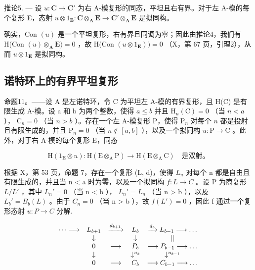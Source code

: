 推论5. --- 设 \(u: \mathbf{C} \to \mathbf{C}'\) 为右 A-模复形的同态，平坦且右有界。对于左 A-模的每个复形 E，态射 \(u \otimes 1_{\mathbf{E}}: \mathbf{C} \otimes_{\mathbf{A}} \mathbf{E} \to \mathbf{C}' \otimes_{\mathbf{A}} \mathbf{E}\) 是拟同构。

确实，Con \((u)\) 是一个平坦复形，右有界且同调为零；因此由推论4，我们有 H(Con \((u) \otimes_{\mathbf{A}} \mathbf{E}) = 0\) ，故 H(Con \((u \otimes 1_{\mathbf{E}})) = 0\) （X，第 67 页，引理2），从而 \(u \otimes 1_{\mathbf{E}}\) 是拟同构。

\subsection{诺特环上的有界平坦复形}

命题11。——设 A 是左诺特环，令 C 为平坦左 A-模的有界复形，且 H(C) 是有限生成 A-模。设 a 和 b 为两个整数，使得 \(a \leqslant b\) 并且 \(\mathrm{H}_{n}(\mathrm{C}) = 0\) （当 \(n < a\) ）， \(\mathrm{C}_{n} = 0\) （当 \(n > b\) ）。存在一个左 A-模复形 P，使得 \(\mathrm{P}_{n}\) 对每个 \(n\) 都是投射且有限生成的，并且 \(\mathrm{P}_{n} = 0\) （当 \(n \notin [a, b]\) ），以及一个拟同构 \(u: \mathrm{P} \to \mathrm{C}\) 。此外，对于右 A-模的每个复形 E，同态

\[
\mathrm{H} \left(1 _ {\mathrm{E}} \otimes u\right): \mathrm{H} (\mathrm{E} \otimes_ {\mathrm{A}} \mathrm{P}) \rightarrow \mathrm{H} (\mathrm{E} \otimes_ {\mathrm{A}} \mathrm{C}) \quad \text{是双射。}
\]

根据 X，第 53 页，命题 7，存在一个复形 (L, d)，使得 \(L_{n}\) 对每个 n 都是自由且有限生成的，并且当 n \textless{} a 时为零，以及一个拟同构 \(f: L \to C\) 。设 P 为商复形 \(L/L'\) ，其中 \(L_{n}' = 0\) （当 n \textless{} b ）， \(L_{n}' = L_{n}\) （当 n \textgreater{} b ），以及 \(L_{b}' = B_{b}(L)\) 。由于 \(C_{n} = 0\) （当 n \textgreater{} b ），故 \(f(L') = 0\) ，因此 f 通过一个复形态射 \(u: P \to C\) 分解.

\[
\begin{array}{c c c c c} \dots \longrightarrow & L _ {b + 1} & \xrightarrow {d _ {b + 1}} & L _ {b} & \xrightarrow {d _ {b}} L _ {b - 1} \longrightarrow \dots \\ & \downarrow & & \downarrow & | | \\ & 0 & \longrightarrow & P _ {b} & \longrightarrow P _ {b - 1} \longrightarrow \dots \\ & \downarrow & & \downarrow^ {u _ {b}} & \downarrow^ {u _ {b - 1}} \\ & 0 & \longrightarrow & C _ {b} & \longrightarrow C _ {b - 1} \longrightarrow \dots \end{array}
\]

